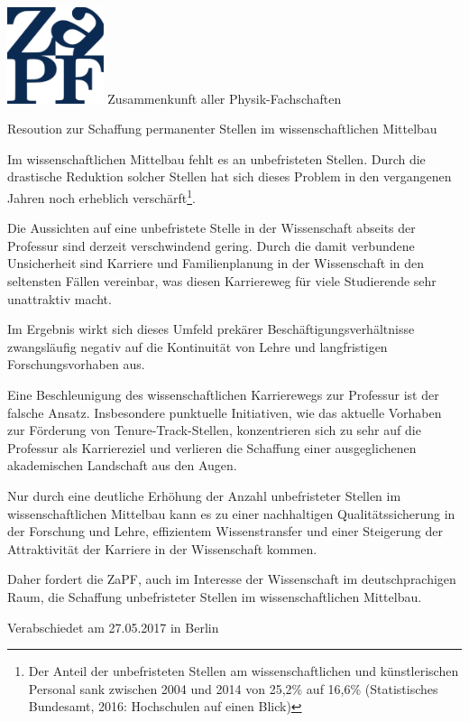 \documentclass[DIV=calc]{scrartcl}
\begin{document}
    \hspace{0.87\textwidth}
    \begin{minipage}{120pt}
        \vspace{-1.8cm}
        \includegraphics[width=80pt]{logo.pdf}
        \centering
        \small Zusammenkunft aller Physik-Fachschaften
    \end{minipage}
    \begin{center}
        \huge{Resoution zur Schaffung permanenter Stellen im wissenschaftlichen Mittelbau} \\
        \normalsize
    \end{center}
    
    \vspace{1cm}    
     Im wissenschaftlichen Mittelbau fehlt es an unbefristeten Stellen. Durch die drastische Reduktion solcher Stellen hat sich dieses Problem in den vergangenen Jahren noch erheblich verschärft\footnote{Der Anteil der unbefristeten Stellen am wissenschaftlichen und künstlerischen Personal sank zwischen 2004 und 2014 von 25,2\% auf 16,6\% (Statistisches Bundesamt, 2016: Hochschulen auf einen Blick)}.

Die Aussichten auf eine unbefristete Stelle in der Wissenschaft abseits der Professur sind derzeit verschwindend gering.
Durch die damit verbundene Unsicherheit sind Karriere und Familienplanung in der Wissenschaft in den seltensten Fällen vereinbar, was diesen Karriereweg für viele Studierende sehr unattraktiv macht.

Im Ergebnis wirkt sich dieses Umfeld prekärer Beschäftigungsverhältnisse zwangsläufig negativ auf die Kontinuität von Lehre und langfristigen Forschungsvorhaben aus.

Eine Beschleunigung des wissenschaftlichen Karrierewegs zur Professur ist der falsche Ansatz. Insbesondere punktuelle Initiativen, wie das aktuelle Vorhaben zur Förderung von Tenure-Track-Stellen, konzentrieren sich zu sehr auf die Professur als Karriereziel und verlieren die Schaffung einer ausgeglichenen akademischen Landschaft aus den Augen.

Nur durch eine deutliche Erhöhung der Anzahl unbefristeter Stellen im wissenschaftlichen Mittelbau kann es zu einer nachhaltigen Qualitätssicherung in der Forschung und Lehre, effizientem Wissenstransfer und einer Steigerung der Attraktivität der Karriere in der Wissenschaft kommen.

Daher fordert die ZaPF, auch im Interesse der Wissenschaft im deutschprachigen Raum, die Schaffung unbefristeter Stellen im wissenschaftlichen Mittelbau.
    
    \vfill
    \begin{flushright}
        Verabschiedet am 27.05.2017 in Berlin
    \end{flushright}

    
\end{document}
